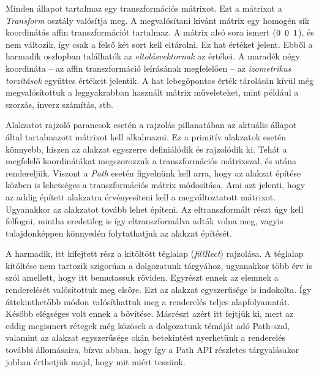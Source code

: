 \documentclass[12pt]{report}
\theoremstyle{definition}
\newcommand{\func}[1]{{\textsl{#1}}}
\begin{document}
Minden állapot tartalmaz egy transzformációs mátrixot. Ezt a mátrixot a
\func{Transform} osztály valósítja meg. A megvalósítani kívánt mátrix egy
homogén sík koordinátás affin transzformációt tartalmaz. A mátrix alsó sora
ismert ($0\enskip 0\enskip 1$), és nem változik, így csak a felső két sort kell
eltárolni. Ez hat értéket jelent. Ebből a harmadik oszlopban találhatók az
\emph{eltolásvektornak} az értékei. A maradék négy koordináta -- az affin
transzformáció leírásának megfelelően -- az \emph{izometrikus torzítások}
együttes értékeit jelentik. A hat lebegőpontos érték tárolásán kívül még
megvalósítottuk a leggyakrabban használt mátrix műveleteket, mint például a
szorzás, inverz számítás, stb.

Alakzatot rajzoló parancsok esetén a rajzolás pillanatában az aktuális állapot
által tartalmazott mátrixot kell alkalmazni. Ez a primitív alakzatok esetén
könnyebb, hiszen az alakzat egyszerre definiálódik és rajzolódik ki. Tehát a
megfelelő koordinátákat megszorozzuk a transzformációs mátrixszal, és utána
rendereljük. Viszont a \emph{Path} esetén figyelnünk kell arra, hogy az alakzat
építése közben is lehetséges a transzformációs mátrix módosítása. Ami azt
jelenti, hogy az addig épített alakzatra érvényesíteni kell a megváltoztatott
mátrixot. Ugyanakkor az alakzatot tovább lehet építeni. Az eltranszformált
részt úgy kell felfogni, mintha eredetileg is így eltranszformálva adták volna
meg, vagyis tulajdonképpen könnyedén folytathatjuk az alakzat építését.

A harmadik, itt kifejtett rész a kitöltött téglalap (\func{fillRect})
rajzolása. A téglalap kitöltése nem tartozik szigorúan a dolgozatunk tárgyához,
ugyanakkor több érv is szól amellett, hogy itt bemutassuk röviden. Egyrészt
ennek az elemnek a renderelését valósítottuk meg elsőre. Ezt az alakzat
egyszerűsége is indokolta. Így áttekinthetőbb módon valósíthattuk meg a
renderelés teljes alapfolyamatát. Később elégséges volt ennek a bővítése.
Másrészt azért itt fejtjük ki, mert az eddig megismert rétegek még közösek a
dolgozatunk témáját adó Path-szal, valamint az alakzat egyszerűsége okán
betekintést nyerhetünk a renderelés további állomásaira, bízva abban, hogy így
a Path API részletes tárgyalásakor jobban érthetjük majd, hogy mit miért
teszünk.
\end{document}
